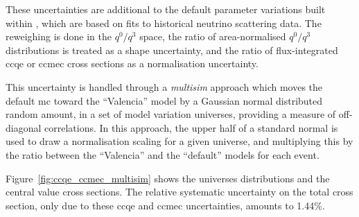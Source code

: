 These uncertainties are additional to the default parameter variations built within \g, which are based on fits to historical neutrino scattering data. 
The reweighing is done in the $q^0/q^3$ space, the ratio of area-normalised $q^0/q^3$ distributions is treated as a shape uncertainty, and the ratio of flux-integrated \acrshort{cc}\acrshort{qe} or \acrshort{cc}\acrshort{mec} cross sections as a normalisation uncertainty.

This uncertainty is handled through a \emph{multisim} approach which moves the default \acrshort{mc} toward the ``Valencia'' model by a Gaussian normal distributed random amount, in a set of model variation universes, providing a measure of off-diagonal correlations. In this approach, the upper half of a standard normal is used to draw a normalisation scaling for a given universe, and multiplying this by the ratio between the ``Valencia'' and the ``default'' models for each event. 

Figure~\ref{fig:ccqe_ccmec_multisim} shows the universes distributions and the central value cross sections.
The relative systematic uncertainty on the total cross section, only due to these \acrshort{cc}\acrshort{qe} and \acrshort{cc}\acrshort{mec} uncertainties, amounts to 1.44\%.

